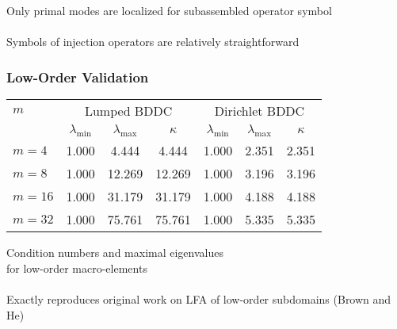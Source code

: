 \documentclass{beamer}
\begin{document}
\begin{frame}
\begin{center}
Only primal modes are localized for subassembled operator symbol\\

~\\

Symbols of injection operators are relatively straightforward\\

\end{center}
\end{frame}


\begin{frame}
\begin{center}
\frametitle{Low-Order Validation}

\begin{table}[ht!]
\begin{center}
\begin{tabular}{l ccc ccc}
  \toprule
  $m$  &  \multicolumn{3}{c}{Lumped BDDC}  &  \multicolumn{3}{c}{Dirichlet BDDC}  \\
                      &  $\lambda_{\min}$  &  $\lambda_{\max}$  &  $\kappa$ & $\lambda_{\min}$  &  $\lambda_{\max}$ & $\kappa$  \\
  \toprule
  $m = 4$   &  1.000  &   4.444  &   4.444  &  1.000  &  2.351  &  2.351  \\
  $m = 8$   &  1.000  &  12.269  &  12.269  &  1.000  &  3.196  &  3.196  \\
  $m = 16$  &  1.000  &  31.179  &  31.179  &  1.000  &  4.188  &  4.188  \\
  $m = 32$  &  1.000  &  75.761  &  75.761  &  1.000  &  5.335  &  5.335  \\
  \bottomrule
\end{tabular}
\end{center}
\label{table:macro_element_bddc}
\end{table}
{\small Condition numbers and maximal eigenvalues\\for low-order macro-elements}\\

~\\

Exactly reproduces original work on LFA of low-order subdomains (Brown and He)

\end{center}
\end{frame}

\end{document}
